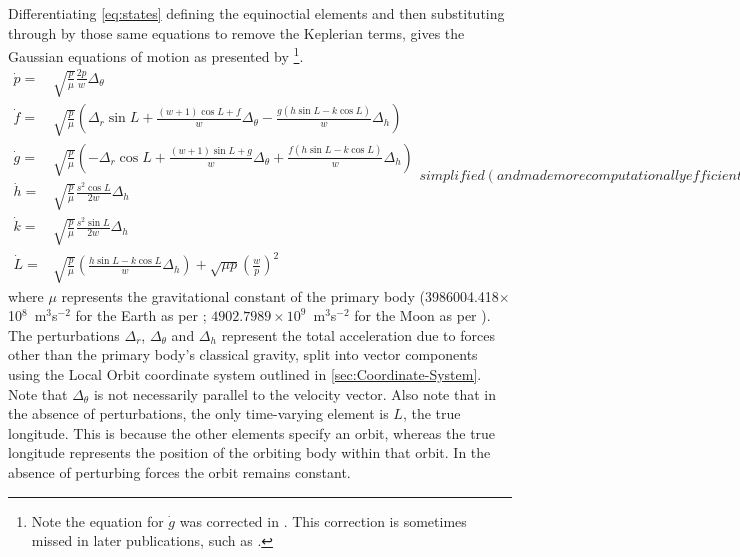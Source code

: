 Differentiating \autoref{eq:states} defining the equinoctial elements and then substituting through by those same equations to remove the Keplerian terms, gives the Gaussian equations of motion as presented by \cite{Walker1985,Walker1986,Keppeler_thesis,Erb_thesis,Letterio_thesis,Hintz2008} \footnote{Note the equation for $\dot{g}$ was corrected in \textcite{Walker1986}. This correction is sometimes missed in later publications, such as \textcite{Hintz2008}.}.
\begin{subequations}\label{eq:state-updates}
\begin{eqnarray}
\dot{p} = & \sqrt{\frac{p}{\mu}}\frac{2p}{w}\Delta_\theta \label{eq:pdot}\\
\dot{f} = & \sqrt{\frac{p}{\mu}}\left(\Delta_r\sin L+\frac{\left(w+1\right)\cos L+f}{w}\Delta_\theta-\frac{g\left(h\sin L-k\cos L\right)}{w}\Delta_h \right) \label{eq:fdot}\\
\dot{g} = & \sqrt{\frac{p}{\mu}}\left(-\Delta_r\cos L+\frac{\left(w+1\right)\sin L+g}{w}\Delta_\theta+\frac{f\left(h\sin L-k\cos L\right)}{w}\Delta_h \right) \label{eq:gdot}\\
\dot{h} = & \sqrt{\frac{p}{\mu}}\frac{s^{2}\cos L}{2w}\Delta_h \label{eq:hdot}\\
\dot{k} = & \sqrt{\frac{p}{\mu}}\frac{s^{2}\sin L}{2w}\Delta_h \label{eq:kdot}\\
\dot{L} = & \sqrt{\frac{p}{\mu}}\left(\frac{h\sin L-k\cos L}{w}\Delta_h \right)+\sqrt{\mu p}\left(\frac{w}{p}\right)^{2} \label{eq:Ldot}
\end{eqnarray}
simplified (and made more computationally efficient) using the terms
\begin{eqnarray}
w & = & 1+f\cos L+g\sin L\label{eq:w_helper}\\
s^{2} & = & 1+h^{2}+k^{2}\label{eq:s2_helper}
\end{eqnarray}
\end{subequations}
where $\mu$ represents the gravitational constant of the primary body \linebreak (3986004.418$\times$10$^8$~m$^3$s$^{-2}$ for the Earth as per \cite{WGS84}; $4902.7989\times10^9$~m$^3$s$^{-2}$ for the Moon as per \cite{Zhang1994}). The perturbations $\Delta_r$, $\Delta_\theta$ and $\Delta_h$ represent the total acceleration due to forces other than the primary body's classical gravity, split into vector components using the Local Orbit coordinate system outlined in \autoref{sec:Coordinate-System}. Note that $\Delta_\theta$ is not necessarily parallel to the velocity vector. Also note that in the absence of perturbations, the only time-varying element is $L$, the true longitude. This is because the other elements specify an orbit, whereas the true longitude represents the position of the orbiting body within that orbit. In the absence of perturbing forces the orbit remains constant.




